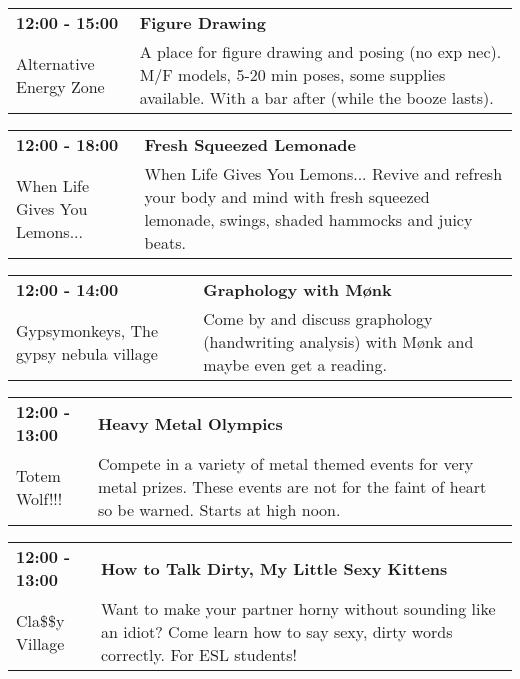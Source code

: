 \begin{tabular}{ p{1in} p{2.2in} }
    \textbf{12:00 - 15:00} & \textbf{Figure Drawing} \\
    Alternative Energy Zone \newline  & A place for figure drawing and posing (no exp nec).  M/F models, 5-20 min poses, some supplies available. With a bar after (while the booze lasts). \\
    \hline 
\end{tabular}
    
\begin{tabular}{ p{1in} p{2.2in} }
    \textbf{12:00 - 18:00} & \textbf{Fresh Squeezed Lemonade} \\
    When Life Gives You Lemons... \newline  & When Life Gives You Lemons... Revive and refresh your body and mind with fresh squeezed lemonade, swings, shaded hammocks and juicy beats. \\
    \hline 
\end{tabular}
    
\begin{tabular}{ p{1in} p{2.2in} }
    \textbf{12:00 - 14:00} & \textbf{Graphology with M\o nk} \\
    Gypsymonkeys, The \newline gypsy nebula village & Come by and discuss graphology (handwriting analysis) with M\o nk and maybe even get a reading. \\
    \hline 
\end{tabular}
    
\begin{tabular}{ p{1in} p{2.2in} }
    \textbf{12:00 - 13:00} & \textbf{Heavy Metal Olympics} \\
    Totem Wolf!!! \newline  & Compete in a variety of metal themed events for very metal prizes. These events are not for the faint of heart so be warned. Starts at high noon. \\
    \hline 
\end{tabular}
    
\begin{tabular}{ p{1in} p{2.2in} }
    \textbf{12:00 - 13:00} & \textbf{How to Talk Dirty, My Little Sexy Kittens} \\
    Cla\$\$y Village \newline  & Want to make your partner horny without sounding like an idiot? Come learn how to say sexy, dirty words correctly. For ESL students! \\
    \hline 
\end{tabular}
    
